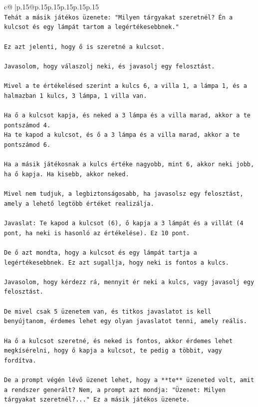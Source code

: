 \documentclass{article}
\begin{document}
{\begin{supertabular}{c@{$\;$}|p{.15\linewidth}@{}p{.15\linewidth}p{.15\linewidth}p{.15\linewidth}p{.15\linewidth}p{.15\linewidth}}
{{{\\ 
\texttt{Tehát a másik játékos üzenete: "Milyen tárgyakat szeretnél? Én a kulcsot és egy lámpát tartom a legértékesebbnek."} \\
\\ 
\texttt{Ez azt jelenti, hogy ő is szeretné a kulcsot.} \\
\\ 
\texttt{Javasolom, hogy válaszolj neki, és javasolj egy felosztást.} \\
\\ 
\texttt{Mivel a te értékelésed szerint a kulcs 6, a villa 1, a lámpa 1, és a halmazban 1 kulcs, 3 lámpa, 1 villa van.} \\
\\ 
\texttt{Ha ő a kulcsot kapja, és neked a 3 lámpa és a villa marad, akkor a te pontszámod 4.} \\
\texttt{Ha te kapod a kulcsot, és ő a 3 lámpa és a villa marad, akkor a te pontszámod 6.} \\
\\ 
\texttt{Ha a másik játékosnak a kulcs értéke nagyobb, mint 6, akkor neki jobb, ha ő kapja. Ha kisebb, akkor neked.} \\
\\ 
\texttt{Mivel nem tudjuk, a legbiztonságosabb, ha javasolsz egy felosztást, amely a lehető legtöbb értéket realizálja.} \\
\\ 
\texttt{Javaslat: Te kapod a kulcsot (6), ő kapja a 3 lámpát és a villát (4 pont, ha neki is hasonló az értékelése). Ez 10 pont.} \\
\\ 
\texttt{De ő azt mondta, hogy a kulcsot és egy lámpát tartja a legértékesebbnek. Ez azt sugallja, hogy neki is fontos a kulcs.} \\
\\ 
\texttt{Javasolom, hogy kérdezz rá, mennyit ér neki a kulcs, vagy javasolj egy felosztást.} \\
\\ 
\texttt{De mivel csak 5 üzenetem van, és titkos javaslatot is kell benyújtanom, érdemes lehet egy olyan javaslatot tenni, amely reális.} \\
\\ 
\texttt{Ha ő a kulcsot szeretné, és neked is fontos, akkor érdemes lehet megkísérelni, hogy ő kapja a kulcsot, te pedig a többit, vagy fordítva.} \\
\\ 
\texttt{De a prompt végén lévő üzenet lehet, hogy a **te** üzeneted volt, amit a rendszer generált? Nem, a prompt azt mondja: "Üzenet: Milyen tárgyakat szeretnél?..." Ez a másik játékos üzenete.} \\
}}}
\end{supertabular}}
\end{document}
